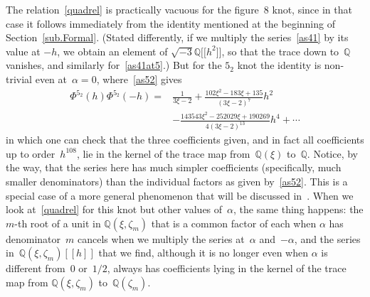 \documentclass[pdftex]{sigma}
\numberwithin{equation}{section}
\def\z{\zeta}
\def\a{\alpha}
\def\Q{\mathbb Q}
\def\m{ - }
\def\a{\alpha}
\def\z{\zeta}
\def\s{\sigma}
\begin{document}
The relation~\eqref{quadrel} is practically vacuous for the figure~8 knot,
since in that case it follows immediately from the identity
\smash{$\Phi_\a^{(4_1,\s_2)}(h)={\rm i}\Phi_{-\a}^{(4_1,\s_1)}(-h)$} mentioned at the beginning
of Section~\ref{sub.Formal}. (Stated differently, if we multiply the
series~\eqref{as41} by its value at $-h$, we obtain an element of
$\sqrt{-3}\Q\big[\big[h^2\big]\big]$, so that the trace down to~$\Q$ vanishes, and similarly
for~\eqref{as41at5}.) But for the $5_2$ knot
the identity is non-trivial even at~$\a=0$, where~\eqref{as52} gives
\begin{align*}
\Phi^{5_2}(h) \Phi^{5_2}(-h)
 ={}& \frac1{3\xi-2} + \frac{102\xi^2 - 183\xi + 135}{(3\xi-2)^7} h^2
\\
&\m \frac{143543 \xi^2 - 252029 \xi + 190269}{4 (3\xi-2)^{13}} h^4+ \cdots
\end{align*}
in which one can check that the three coefficients given, and in fact all
coefficients up to order~$h^{108}$, lie in the kernel of the trace map from~$\Q(\xi)$
to~$\Q$. Notice, by the way, that the series here has much simpler coefficients
(specifically, much smaller denominators) than the individual factors as given
by~\eqref{as52}. This is a special case of a more general phenomenon that will be
discussed in~\cite{GSZ:habiro}. When we look at~\eqref{quadrel} for this knot but
other values of~$\a$, the same thing happens: the $m$-th root of a unit in
$\Q(\xi,\z_m)$ that is a common factor of each \smash{$\Phi^{(5_2)}_\a(h)$} when
$\a$ has denominator~$m$ cancels when we multiply the series at~$\a$
and~$-\a$, and the series in~$\Q(\xi,\z_m)[[h]]$ that we find, although
it is no longer even when $\a$ is different from~0 or~$1/2$, always has coefficients
lying in the kernel of the trace map from $\Q(\xi,\z_m)$ to~$\Q(\z_m)$.
\end{document}
